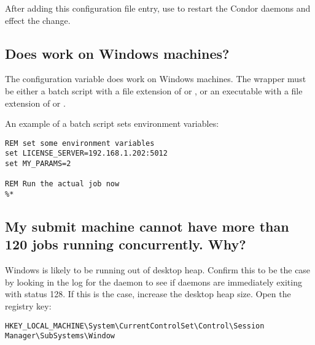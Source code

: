 After adding this configuration file entry, use 
to restart the Condor daemons and effect the change.

%

\subsection*{Does  work on Windows machines?}
The  configuration variable
does work on Windows machines.
The wrapper must be either a
batch script with a file extension of  or ,
or an
executable with a file extension of  or .

An example of a batch script sets environment variables:
\footnotesize
\begin{verbatim}
REM set some environment variables
set LICENSE_SERVER=192.168.1.202:5012
set MY_PARAMS=2

REM Run the actual job now
%*
\end{verbatim}
\normalsize


\subsection*{My submit machine cannot have more than 120 jobs running concurrently. Why?}

Windows is likely to be running out of desktop heap. 
Confirm this to be the case
by looking in the log for the  daemon
to see if  daemons are immediately
exiting with status 128.
If this is the case, increase the desktop heap size.
Open the registry key:

\footnotesize
\begin{verbatim}
HKEY_LOCAL_MACHINE\System\CurrentControlSet\Control\Session Manager\SubSystems\Window
\end{verbatim}
\normalsize

